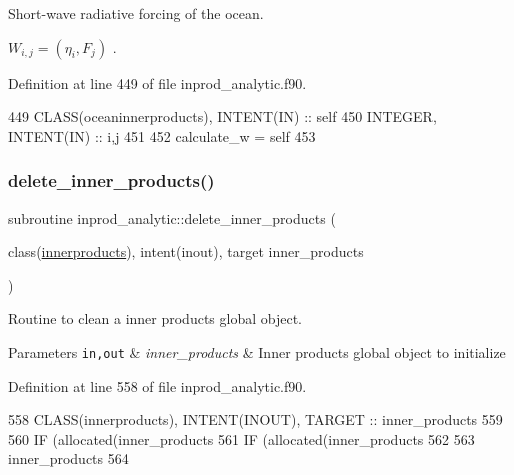 Short-\/wave radiative forcing of the ocean. 

$ W_{i,j} = (\eta_i, F_j)$ . 

Definition at line 449 of file inprod\+\_\+analytic.\+f90.


\begin{DoxyCode}
449     \textcolor{keywordtype}{CLASS}(oceaninnerproducts), \textcolor{keywordtype}{INTENT(IN)} :: self
450     \textcolor{keywordtype}{INTEGER}, \textcolor{keywordtype}{INTENT(IN)} :: i,j
451     
452     calculate\_w = self%
453 
\end{DoxyCode}
\mbox{\label{namespaceinprod__analytic_a1319e98f839daff8d840469929c349fb}} 
\subsubsection{\texorpdfstring{delete\+\_\+inner\+\_\+products()}{delete\_inner\_products()}}
{\footnotesize\ttfamily subroutine inprod\+\_\+analytic\+::delete\+\_\+inner\+\_\+products (\begin{DoxyParamCaption}\item[{class(\hyperlink{structinprod__analytic_1_1innerproducts}{innerproducts}), intent(inout), target}]{inner\+\_\+products }\end{DoxyParamCaption})\hspace{0.3cm}{\ttfamily [private]}}



Routine to clean a inner products global object. 


\begin{DoxyParams}[1]{Parameters}
\mbox{\tt in,out}  & {\em inner\+\_\+products} & Inner products global object to initialize \\
\hline
\end{DoxyParams}


Definition at line 558 of file inprod\+\_\+analytic.\+f90.


\begin{DoxyCode}
558     \textcolor{keywordtype}{CLASS}(innerproducts), \textcolor{keywordtype}{INTENT(INOUT)}, \textcolor{keywordtype}{TARGET} :: inner\_products
559 
560     \textcolor{keywordflow}{IF} (\textcolor{keyword}{allocated}(inner\_products%
561     \textcolor{keywordflow}{IF} (\textcolor{keyword}{allocated}(inner\_products%
562 
563     inner\_products%
564 
\end{DoxyCode}
\mbox{\label{namespaceinprod__analytic_ad2e5c28272f877bf96af8ee821004386}} 
